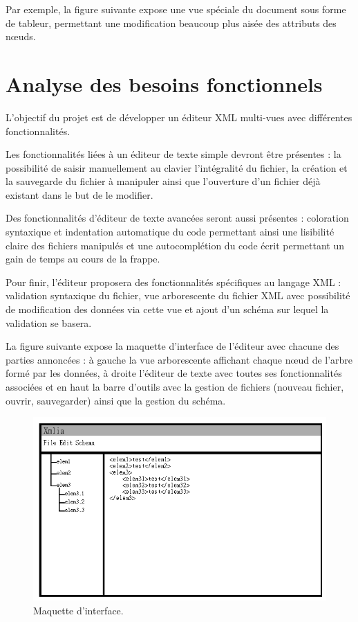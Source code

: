 	Par exemple, la figure suivante expose une vue spéciale du document sous forme de tableur, permettant une modification beaucoup plus aisée des attributs des nœuds.





	\section{Analyse des besoins fonctionnels}
	L'objectif du projet est de développer un éditeur XML multi-vues avec différentes fonctionnalités.
	
	Les fonctionnalités liées à un éditeur de texte simple devront être présentes : la possibilité de saisir manuellement au clavier l'intégralité du fichier, la création et la sauvegarde du fichier à manipuler ainsi que l'ouverture d'un fichier déjà existant dans le but de le modifier.
	
	Des fonctionnalités d'éditeur de texte avancées seront aussi présentes : coloration syntaxique et indentation automatique du code permettant ainsi une lisibilité claire des fichiers manipulés et une autocomplétion du code écrit permettant un gain de temps au cours de la frappe.

	Pour finir, l'éditeur proposera des fonctionnalités spécifiques au langage XML : validation syntaxique du fichier, vue arborescente du fichier XML avec possibilité de modification des données via cette vue et ajout d'un schéma sur lequel la validation se basera.
	
	La figure suivante expose la maquette d'interface de l'éditeur avec chacune des parties annoncées : à gauche la vue arborescente affichant chaque nœud de l'arbre formé par les données, à droite l'éditeur de texte avec toutes ses fonctionnalités associées et en haut la barre d'outils avec la gestion de fichiers (nouveau fichier, ouvrir, sauvegarder) ainsi que la gestion du schéma.

\begin{figure}[H]
      \centering
      \includegraphics[scale=0.5]{images/analyse-maquette.png}
      \caption[Maquette d'interface]{Maquette d'interface.}
\end{figure}
	
